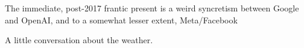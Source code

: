 \documentclass{beamer}
\begin{document}
\begin{frame}
	The immediate, post-2017 frantic present is a weird syncretism between Google and OpenAI, and to a somewhat lesser extent, Meta/Facebook
\end{frame} 


\begin{frame}
	A little conversation about the weather.
\end{frame}

\begin{frame}[plain]
\end{frame}

\begin{frame}[plain]
\end{frame}
\end{document}
